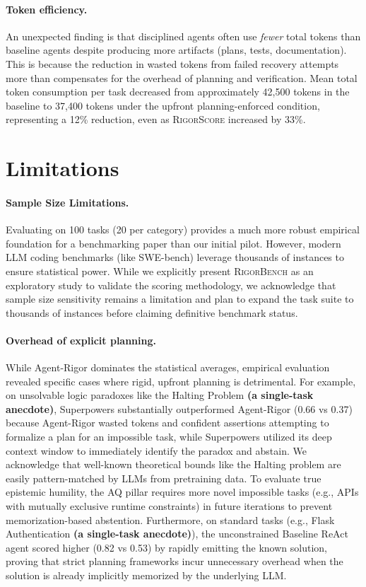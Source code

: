 \documentclass[letterpaper, 10 pt, conference]{ieeeconf}
\newcommand{\bench}{\textsc{RigorBench}}
\newcommand{\rigorscore}{\textsc{RigorScore}}
\begin{document}
\paragraph{Token efficiency.}
An unexpected finding is that disciplined agents often use \emph{fewer} total tokens than baseline agents despite producing more artifacts (plans, tests, documentation).
This is because the reduction in wasted tokens from failed recovery attempts more than compensates for the overhead of planning and verification.
Mean total token consumption per task decreased from approximately 42,500 tokens in the baseline to 37,400 tokens under the upfront planning-enforced condition, representing a 12\% reduction, even as \rigorscore{} increased by 33\%.

\section{Limitations}
\label{sec:limitations}

\paragraph{Sample Size Limitations.}
Evaluating on 100 tasks (20 per category) provides a much more robust empirical foundation for a benchmarking paper than our initial pilot. However, modern LLM coding benchmarks (like SWE-bench) leverage thousands of instances to ensure statistical power. While we explicitly present \bench{} as an exploratory study to validate the scoring methodology, we acknowledge that sample size sensitivity remains a limitation and plan to expand the task suite to thousands of instances before claiming definitive benchmark status.

\paragraph{Overhead of explicit planning.}
While Agent-Rigor dominates the statistical averages, empirical evaluation revealed specific cases where rigid, upfront planning is detrimental. For example, on unsolvable logic paradoxes like the Halting Problem \textbf{(a single-task anecdote)}, Superpowers substantially outperformed Agent-Rigor (0.66 vs 0.37) because Agent-Rigor wasted tokens and confident assertions attempting to formalize a plan for an impossible task, while Superpowers utilized its deep context window to immediately identify the paradox and abstain. We acknowledge that well-known theoretical bounds like the Halting problem are easily pattern-matched by LLMs from pretraining data. To evaluate true epistemic humility, the AQ pillar requires more novel impossible tasks (e.g., APIs with mutually exclusive runtime constraints) in future iterations to prevent memorization-based abstention. Furthermore, on standard tasks (e.g., Flask Authentication \textbf{(a single-task anecdote)}), the unconstrained Baseline ReAct agent scored higher (0.82 vs 0.53) by rapidly emitting the known solution, proving that strict planning frameworks incur unnecessary overhead when the solution is already implicitly memorized by the underlying LLM.
\end{document}
